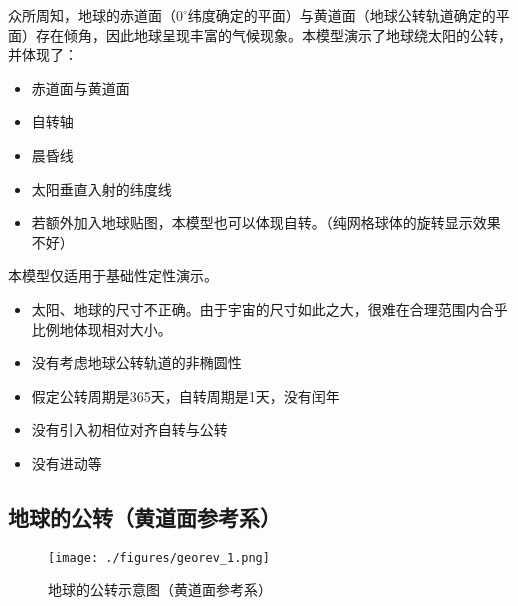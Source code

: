 

众所周知，地球的赤道面（$0 ^\circ$纬度确定的平面）与黄道面（地球公转轨道确定的平面）存在倾角，因此地球呈现丰富的气候现象。本模型演示了地球绕太阳的公转，并体现了：
\begin{itemize}
\item 赤道面与黄道面
\item 自转轴
\item 晨昏线
\item 太阳垂直入射的纬度线
\item 若额外加入地球贴图，本模型也可以体现自转。（纯网格球体的旋转显示效果不好）
\end{itemize}

本模型仅适用于基础性定性演示。
\begin{itemize}
\item 太阳、地球的尺寸不正确。由于宇宙的尺寸如此之大，很难在合理范围内合乎比例地体现相对大小。
\item 没有考虑地球公转轨道的非椭圆性
\item 假定公转周期是365天，自转周期是1天，没有闰年
\item 没有引入初相位对齐自转与公转
\item 没有进动等
\end{itemize}

\subsection{地球的公转（黄道面参考系）}
\begin{figure}[ht]
\centering
\texttt{[image: ./figures/georev\_1.png]}
\caption{地球的公转示意图（黄道面参考系）} \label{georev_fig1}
\end{figure}

